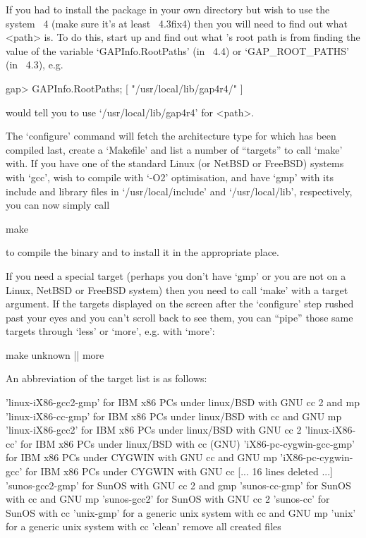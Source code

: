 If you had to install the package in your own directory but wish  to  use
the system {\GAP}~4 (make sure it's at  least  {\GAP}~4.3fix4)  then  you
will need to find out what <path> is. To do this,  start  up  {\GAP}  and
find out what {\GAP}'s root  path  is  from  finding  the  value  of  the
variable `GAPInfo.RootPaths'  (in  {\GAP}~4.4)  or  `GAP_ROOT_PATHS'  (in
{\GAP}~4.3), e.g.

\begintt
gap> GAPInfo.RootPaths;
[ "/usr/local/lib/gap4r4/" ]
\endtt

would tell you to use `/usr/local/lib/gap4r4' for <path>.

The `configure' command will fetch the architecture type for which {\GAP}
has been compiled  last,  create  a  `Makefile'  and  list  a  number  of
``targets'' to call `make' with. If you have one of  the  standard  Linux
(or NetBSD or FreeBSD) systems with `gcc', wish  to  compile  with  `-O2'
optimisation, and have `gmp'  with  its  include  and  library  files  in
`/usr/local/include' and  `/usr/local/lib',  respectively,  you  can  now
simply call

\begintt
make
\endtt

to compile the binary and to install it in the appropriate place.

If you need a special target (perhaps you don't have `gmp' or you are not
on a Linux, NetBSD or FreeBSD system) then you need to call `make' with a
target argument. If  the  targets  displayed  on  the  screen  after  the
`configure' step rushed past your eyes and you can't scroll back  to  see
them, you can ``pipe'' those same targets through `less' or `more',  e.g.
with `more':

\begintt
make unknown || more
\endtt

An abbreviation of the target list is as follows:

\begintt
'linux-iX86-gcc2-gmp'      for IBM x86 PCs under linux/BSD with GNU cc 2 and mp
'linux-iX86-cc-gmp'        for IBM x86 PCs under linux/BSD with cc and GNU mp
'linux-iX86-gcc2'          for IBM x86 PCs under linux/BSD with GNU cc 2
'linux-iX86-cc'            for IBM x86 PCs under linux/BSD with cc (GNU)
'iX86-pc-cygwin-gcc-gmp'   for IBM x86 PCs under CYGWIN with GNU cc and GNU mp
'iX86-pc-cygwin-gcc'       for IBM x86 PCs under CYGWIN with GNU cc
[... 16 lines deleted ...]
'sunos-gcc2-gmp'           for SunOS with GNU cc 2 and gmp
'sunos-cc-gmp'             for SunOS with cc and GNU mp
'sunos-gcc2'               for SunOS with GNU cc 2
'sunos-cc'                 for SunOS with cc
'unix-gmp'                 for a generic unix system with cc and GNU mp
'unix'                     for a generic unix system with cc
'clean'                    remove all created files

